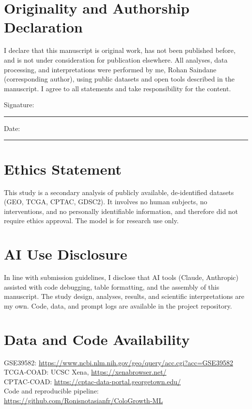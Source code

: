 \documentclass[11pt]{article}
\begin{document}
\section*{Originality and Authorship Declaration}

I declare that this manuscript is original work, has not been published before, and is not under consideration for publication elsewhere. All analyses, data processing, and interpretations were performed by me, Rohan Saindane (corresponding author), using public datasets and open tools described in the manuscript. I agree to all statements and take responsibility for the content.

Signature: \rule{6cm}{0.4pt} \hfill Date: \rule{4cm}{0.4pt}

\section*{Ethics Statement}

This study is a secondary analysis of publicly available, de-identified datasets (GEO, TCGA, CPTAC, GDSC2). It involves no human subjects, no interventions, and no personally identifiable information, and therefore did not require ethics approval. The model is for research use only.

\section*{AI Use Disclosure}

In line with submission guidelines, I disclose that AI tools (Claude, Anthropic) assisted with code debugging, table formatting, and the assembly of this manuscript. The study design, analyses, results, and scientific interpretations are my own. Code, data, and prompt logs are available in the project repository.

\section*{Data and Code Availability}
GSE39582: \url{https://www.ncbi.nlm.nih.gov/geo/query/acc.cgi?acc=GSE39582}\\
TCGA-COAD: UCSC Xena, \url{https://xenabrowser.net/}\\
CPTAC-COAD: \url{https://cptac-data-portal.georgetown.edu/}\\
Code and reproducible pipeline: \url{https://github.com/Ronisnotasianfr/ColoGrowth-ML}

\newpage


\end{document}

